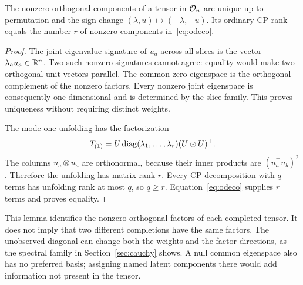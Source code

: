 \begin{lemma}\label{lem:unique-factors}
The nonzero orthogonal components of a tensor in $\mathcal O_n$ are unique up to permutation and the sign change $(\lambda,u)\mapsto(-\lambda,-u)$. Its ordinary CP rank equals the number $r$ of nonzero components in~\eqref{eq:odeco}.
\end{lemma}
\begin{proof}
The joint eigenvalue signature of $u_a$ across all slices is the vector $\lambda_a u_a\in\mathbb R^n$. Two such nonzero signatures cannot agree: equality would make two orthogonal unit vectors parallel. The common zero eigenspace is the orthogonal complement of the nonzero factors. Every nonzero joint eigenspace is consequently one-dimensional and is determined by the slice family. This proves uniqueness without requiring distinct weights.

The mode-one unfolding has the factorization
\[
 T_{(1)}=U\operatorname{diag}(\lambda_1,\ldots,\lambda_r)(U\odot U)^\top.
\]
The columns $u_a\otimes u_a$ are orthonormal, because their inner products are $(u_a^\top u_b)^2$. Therefore the unfolding has matrix rank $r$. Every CP decomposition with $q$ terms has unfolding rank at most $q$, so $q\ge r$. Equation~\eqref{eq:odeco} supplies $r$ terms and proves equality.
\end{proof}

This lemma identifies the nonzero orthogonal factors of each completed tensor. It does not imply that two different completions have the same factors. The unobserved diagonal can change both the weights and the factor directions, as the spectral family in Section~\ref{sec:cauchy} shows. A null common eigenspace also has no preferred basis; assigning named latent components there would add information not present in the tensor.
